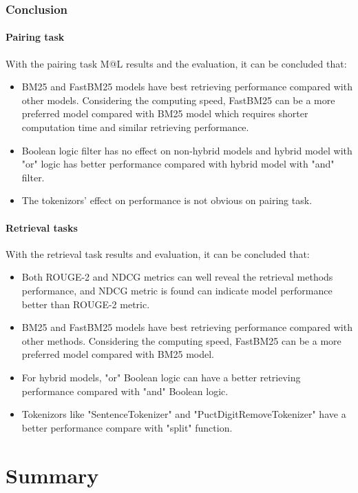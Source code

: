 \subsection{Conclusion}
\subsubsection{Pairing task}

With the pairing task M@L results and the evaluation, it can be concluded that:
\begin{itemize}
	\item BM25 and FastBM25 models have best retrieving performance compared with other models. Considering the computing speed, FastBM25 can be a more preferred model compared with BM25 model which requires shorter computation time and similar retrieving performance.
	\item Boolean logic filter has no effect on non-hybrid models and hybrid model with "or" logic has better performance compared with hybrid model with "and" filter.
	\item The tokenizors' effect on performance is not obvious on pairing task.
\end{itemize}

\subsubsection{Retrieval tasks}

With the retrieval task results and evaluation, it can be concluded that:
\begin{itemize}
	\item Both ROUGE-2 and NDCG metrics can well reveal the retrieval methods performance, and NDCG metric is found can indicate model performance better than ROUGE-2 metric.
	\item BM25 and FastBM25 models have best retrieving performance compared with other methods. Considering the computing speed, FastBM25 can be a more preferred model compared with BM25 model.
	\item For hybrid models, "or" Boolean logic can have a better retrieving performance compared with "and" Boolean logic.
	\item Tokenizors like "SentenceTokenizer" and "PuctDigitRemoveTokenizer" have a better performance compare with "split" function.
\end{itemize}

\chapter{Summary}

